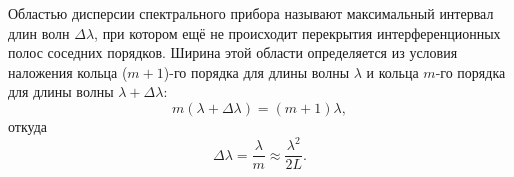 Областью дисперсии спектрального прибора называют максимальный 
интервал длин волн $\Delta\lambda$, при котором ещё не происходит
перекрытия интерференционных полос соседних порядков. 
Ширина этой области определяется из условия наложения кольца
($m+1$)-го порядка для длины волны $\lambda$ и кольца $m$-го 
порядка для длины волны $\lambda+\Delta\lambda$:
$$
m\left(\lambda+\Delta\lambda\right)=\left(m+1\right)\lambda,
$$
\noindent откуда
\begin{equation}\label{eq::10}
  \Delta\lambda = \frac{\lambda}{m} \approx \frac{\lambda^{2}}{2L}.
\end{equation}
\noindent 